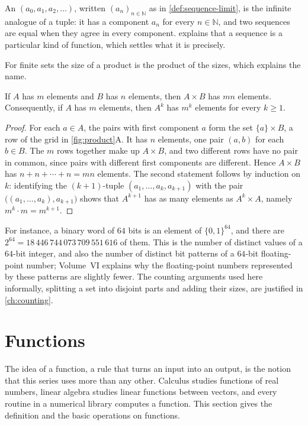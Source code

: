 An  $(a_0,a_1,a_2,\ldots)$, written $(a_n)_{n\in\mathbb N}$ as in \cref{def:sequence-limit}, is the infinite analogue of a tuple: it has a component $a_n$ for every $n\in\mathbb N$, and two sequences are equal when they agree in every component.  explains that a sequence is a particular kind of function, which settles what it is precisely.

For finite sets the size of a product is the product of the sizes, which explains the name.

\begin{proposition}
\label{prop:product-size}
If $A$ has $m$ elements and $B$ has $n$ elements, then $A\times B$ has $mn$ elements. Consequently, if $A$ has $m$ elements, then $A^k$ has $m^k$ elements for every $k\ge1$.
\end{proposition}

\begin{proof}
For each $a\in A$, the pairs with first component $a$ form the set $\{a\}\times B$, a row of the grid in \cref{fig:product}A. It has $n$ elements, one pair $(a,b)$ for each $b\in B$. The $m$ rows together make up $A\times B$, and two different rows have no pair in common, since pairs with different first components are different. Hence $A\times B$ has $n+n+\cdots+n=mn$ elements. The second statement follows by induction on $k$: identifying the $(k+1)$-tuple $(a_1,\ldots,a_k,a_{k+1})$ with the pair $\bigl((a_1,\ldots,a_k),a_{k+1}\bigr)$ shows that $A^{k+1}$ has as many elements as $A^k\times A$, namely $m^k\cdot m=m^{k+1}$.
\end{proof}

For instance, a binary word of $64$ bits is an element of $\{0,1\}^{64}$, and there are $2^{64}=18\,446\,744\,073\,709\,551\,616$ of them. This is the number of distinct values of a $64$-bit integer, and also the number of distinct bit patterns of a $64$-bit floating-point number; Volume~VI explains why the floating-point numbers represented by these patterns are slightly fewer. The counting arguments used here informally, splitting a set into disjoint parts and adding their sizes, are justified in \cref{ch:counting}.

\section{Functions}
\label{sec:functions}

The idea of a function, a rule that turns an input into an output, is the notion that this series uses more than any other. Calculus studies functions of real numbers, linear algebra studies linear functions between vectors, and every routine in a numerical library computes a function. This section gives the definition and the basic operations on functions.

